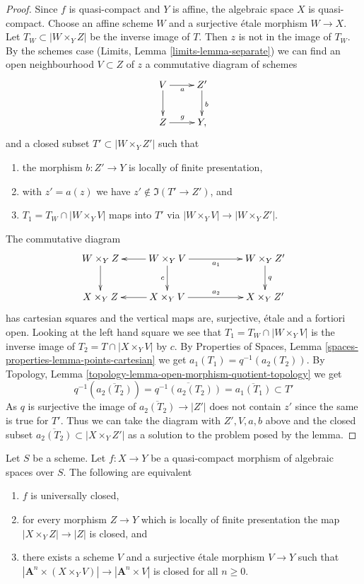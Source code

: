 \begin{proof}
\medskip\noindent
Since $f$ is quasi-compact and $Y$ is affine, the algebraic space
$X$ is quasi-compact. Choose an affine scheme $W$ and a surjective
\'etale morphism $W \to X$. Let $T_W \subset |W \times_Y Z|$
be the inverse image of $T$. Then $z$ is not in the image of
$T_W$. By the schemes case (Limits, Lemma \ref{limits-lemma-separate})
we can find an open neighbourhood $V \subset Z$ of $z$
a commutative diagram of schemes
$$
\xymatrix{
V \ar[d] \ar[r]_a & Z' \ar[d]^b \\
Z \ar[r]^g & Y,
}
$$
and a closed subset $T' \subset |W \times_Y Z'|$ such that
\begin{enumerate}
\item the morphism $b : Z' \to Y$ is locally of finite presentation,
\item with $z' = a(z)$ we have $z' \not \in \Im(T' \to Z')$, and
\item $T_1 = T_W \cap |W \times_Y V|$ maps into $T'$ via
$|W \times_Y V| \to |W \times_Y Z'|$.
\end{enumerate}
The commutative diagram
$$
\xymatrix{
W \times_Y Z \ar[d] &
W \times_Y V \ar[l] \ar[rr]_{a_1} \ar[d]_c & &
W \times_Y Z' \ar[d]^q \\
X \times_Y Z &
X \times_Y V \ar[l] \ar[rr]^{a_2} & &
X \times_Y Z'
}
$$
has cartesian squares and the vertical maps are, surjective, \'etale
and a fortiori open. Looking at the left hand square we
see that $T_1 = T_W \cap |W \times_Y V|$ is the inverse image of
$T_2 = T \cap |X \times_Y V|$ by $c$. By Properties of Spaces, Lemma
\ref{spaces-properties-lemma-points-cartesian} we get
$a_1(T_1) = q^{-1}(a_2(T_2))$.
By Topology, Lemma \ref{topology-lemma-open-morphism-quotient-topology}
we get
$$
q^{-1}\left(\overline{a_2(T_2)}\right) =
\overline{q^{-1}(a_2(T_2))} =
\overline{a_1(T_1)} \subset T'
$$
As $q$ is surjective the image of $\overline{a_2(T_2)} \to |Z'|$
does not contain $z'$ since the same is true for $T'$.
Thus we can take the diagram with $Z', V, a, b$ above and the
closed subset $\overline{a_2(T_2)} \subset |X \times_Y Z'|$ as
a solution to the problem posed by the lemma.
\end{proof}

\begin{lemma}
\label{lemma-test-universally-closed}
Let $S$ be a scheme.
Let $f : X \to Y$ be a quasi-compact morphism of algebraic spaces over $S$.
The following are equivalent
\begin{enumerate}
\item $f$ is universally closed,
\item for every morphism $Z \to Y$ which is locally of finite presentation
the map $|X \times_Y Z| \to |Z|$ is closed, and
\item there exists a scheme $V$ and a surjective \'etale morphism $V \to Y$
such that $|\mathbf{A}^n \times (X \times_Y V)| \to |\mathbf{A}^n \times V|$
is closed for all $n \geq 0$.
\end{enumerate}
\end{lemma}

